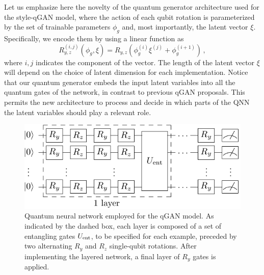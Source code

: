 \documentclass[twocolumn,preprintnumbers,superscriptaddress]{revtex4-2}
\begin{document}
Let us emphasize here the novelty of the quantum generator architecture used for the style-qGAN model, where the action of each qubit rotation is parameterized by the set of trainable parameters $\phi_g$ and, most importantly, the latent vector $\xi$. Specifically, we encode them by using a linear function as
\begin{equation}
    \label{eq:rotation} R_{y,z}^{(i,j)}\left(\phi_g, \xi\right) = R_{y,z}\left(\phi_g^{(i)} \xi^{(j)} + \phi_g^{(i+1)}\right)\,,
\end{equation}
where $i,j$ indicates the component of the vector. The length of the latent vector $\xi$ will depend on the choice of latent dimension for each implementation. Notice that our quantum generator embeds the input latent variables into all the quantum gates of the network, in contrast to previous qGAN proposals. This permits the new architecture to process and decide in which
parts of the QNN the latent variables should play a relevant role.

\begin{figure}
  \includegraphics[width=1.0\columnwidth]{plots/ansatz1.pdf}
  \caption{\label{fig:circuit}Quantum neural network employed for the qGAN model. As indicated by the dashed box, each layer is composed of a set of entangling gates $U_{\rm ent}$, to be specified for each example, preceded by two alternating $R_y$ and $R_z$ single-qubit rotations. After implementing the layered network, a final layer of $R_y$ gates is applied.}
\end{figure}
\end{document}
